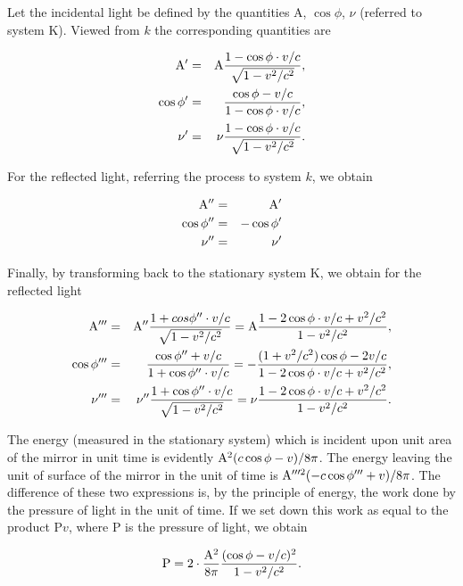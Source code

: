 \documentclass{article}
\begin{document}
Let the incidental light be defined by the quantities A, $\cos\phi$,
$\nu$ (referred to system K)\@.  Viewed from $k$ the corresponding quantities
are

\begin{eqnarray*}
{\rm A'} & = & {\rm A}\frac{1-\cos\phi\cdot v/c}{\sqrt{1-v^2/c^2}}, \\
\cos\phi' & = & \frac{\cos\phi-v/c}{1-\cos\phi\cdot v/c}, \\
\nu' & = & \nu\frac{1-\cos\phi\cdot v/c}{\sqrt{1-v^2/c^2}}. \\
\end{eqnarray*}

\noindent
For the reflected light, referring the process to system $k$, we obtain

\begin{eqnarray*}
{\rm A''} & = & {\rm A'} \\
\cos\phi'' & = & -\cos\phi' \\
\nu'' & = & \nu' \\
\end{eqnarray*}

\noindent
Finally, by transforming back to the stationary system K, we obtain for
the reflected light


\begin{eqnarray*}
{\rm A'''} & = & {\rm A''}\frac{1+cos\phi''\cdot v/c}{\sqrt{1-v^2/c^2}} = {\rm A}\frac{1-2\cos\phi\cdot v/c+v^2/c^2}{1-v^2/c^2}, \\
\cos\phi''' & = & \frac{\cos\phi''+v/c}{1+\cos\phi''\cdot v/c} = -\frac{(1 + v^2/c^2)\cos\phi-2v/c}{1-2\cos\phi\cdot v/c+v^2/c^2}, \\
\nu''' & = & \nu''\frac{1+\cos\phi''\cdot v/c}{\sqrt{1-v^2/c^2}} = \nu\frac{1-2\cos\phi\cdot v/c+v^2/c^2}{1-v^2/c^2}. \\
\end{eqnarray*}

The energy (measured in the stationary system) which is incident upon
unit area of the mirror in unit time is evidently
${\rm A}^2(c\cos\phi-v)/8\pi$.
The energy leaving the unit of surface of the mirror in the unit of
time is
${\rm A}'''^2(-c\cos\phi'''+v)/8\pi$.
The difference of these two
expressions is, by the principle of energy, the work done by the
pressure of light in the unit of time.  If we set down this work as
equal to the product P$v$, where P is the pressure of light, we obtain

\[
{\rm P}=2\cdot\frac{{\rm A}^2}{8\pi}\frac{(\cos\phi-v/c)^2}{1-v^2/c^2}.
\]
\end{document}
